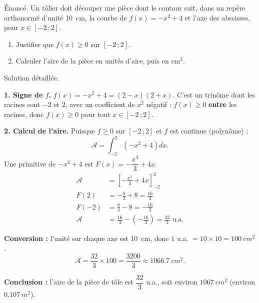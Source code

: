 \documentclass[11pt]{article}
\newcommand{\legende}[1]{\par\vspace{6pt}{\popsemi\fontsize{9}{11.5}\selectfont\color{popmuted}#1}}
\begin{document}
\begin{exoresolu}
Énoncé. Un tôlier doit découper une pièce dont le contour suit, dans un repère orthonormé d'unité \SI{10}{cm}, la courbe de $f(x) = -x^2 + 4$ et l'axe des abscisses, pour $x \in [-2\,;2]$.
\begin{enumerate}
\item Justifier que $f(x) \geq 0$ sur $[-2\,;2]$.
\item Calculer l'aire de la pièce en unités d'aire, puis en cm$^2$.
\end{enumerate}
\tcblower
Solution détaillée.

\textbf{1. Signe de $f$.} $f(x) = -x^2 + 4 = (2-x)(2+x)$. C'est un trinôme dont les racines sont $-2$ et $2$, avec un coefficient de $x^2$ négatif : $f(x) \geq 0$ \textbf{entre} les racines, donc $f(x) \geq 0$ pour tout $x \in [-2\,;2]$.

\textbf{2. Calcul de l'aire.} Puisque $f \geq 0$ sur $[-2\,;2]$ et $f$ est continue (polynôme) :
\[ \mathcal{A} = \int_{-2}^{2} \left(-x^2 + 4\right) dx. \]
Une primitive de $-x^2 + 4$ est $F(x) = -\dfrac{x^3}{3} + 4x$.
\begin{align*}
\mathcal{A} &= \left[-\frac{x^3}{3} + 4x\right]_{-2}^{2} \\
F(2) &= -\frac{8}{3} + 8 = \frac{16}{3} \\
F(-2) &= \frac{8}{3} - 8 = -\frac{16}{3} \\
\mathcal{A} &= \frac{16}{3} - \left(-\frac{16}{3}\right) = \frac{32}{3} \text{ u.a.}
\end{align*}

\textbf{Conversion :} l'unité sur chaque axe est \SI{10}{cm}, donc $1$ u.a. $= 10 \times 10 = \SI{100}{cm^2}$.
\[ \mathcal{A} = \frac{32}{3} \times 100 = \frac{3200}{3} \approx \SI{1066,7}{cm^2}. \]

\textbf{Conclusion :} l'aire de la pièce de tôle est $\dfrac{32}{3}$ u.a., soit environ $\SI{1067}{cm^2}$ (environ $\SI{0,107}{m^2}$).
\end{exoresolu}

\begin{popfigure}
\legende{Aire entre $\mathcal{C}_f$ ($f(x)=x+2$) et $\mathcal{C}_g$ ($g(x)=x^2$) sur $[-1;2]$.}
\end{popfigure}
\end{document}
